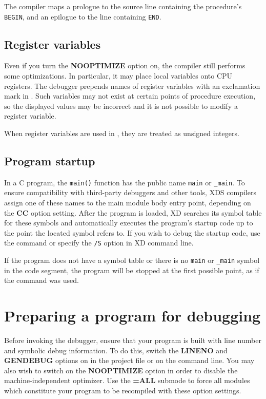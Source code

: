 The compiler maps a prologue to the source line containing the procedure's \verb'BEGIN',
and an epilogue to the line containing \verb'END'.

\subsection{Register variables}
\label{start:general:regvars}

Even if you turn the {\bf NOOPTIMIZE} option on, the compiler still performs
some optimizations. In particular, it may place local variables onto CPU registers.
The debugger prepends names of register variables with an exclamation mark in
.
Such variables may not exist at certain points of procedure execution, so the
displayed values may be incorrect and it is not possible to modify a register
variable.

When register variables are used in ,
they are treated as unsigned integers.

\subsection{Program startup}
\label{start:general:startup}

In a C program, the \verb'main()' function has the public name
\verb'main' or \verb'_main'. To ensure compatibility with third-party
debuggers and other tools, XDS compilers assign one of these names
to the main module body entry point, depending on the {\bf CC} option setting.
After the program is loaded, XD searches its symbol table for
these symbols and automatically executes the program's startup code
up to the point the located symbol refers to. If you wish to debug the startup
code, use the  command
or specify the \verb'/S' option in XD command line.

If the program does not have a symbol table or there is no
\verb'main' or \verb'_main' symbol in the code segment,
the program will be stopped at the first possible point, 
as if the 
command was used.

\section{Preparing a program for debugging}
\label{start:prepare}

Before invoking the debugger, ensure that your program is built with
line number and symbolic debug information. To do this, switch the
{\bf LINENO} and {\bf GENDEBUG} options on in the project file
or on the command line. You may also wish to switch on the
{\bf NOOPTIMIZE} option in order to disable the machine-independent
optimizer. Use the {\bf =ALL} submode to force all
modules which constitute your program to be recompiled with
these option settings.

